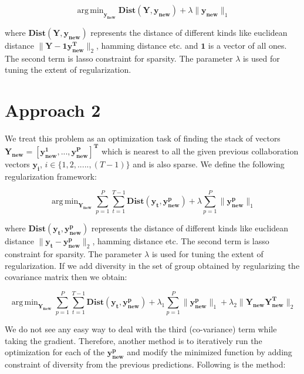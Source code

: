 \documentclass{sig-alternate}
\DeclareMathOperator*{\argmin}{arg\,min}
\begin{document}
\begin{equation}
\argmin_{\mathbf{y_{new}}}   \mathbf{Dist(Y,y_{new})} + \lambda \| \mathbf{y_{new}} \|_{1}
\end{equation}

where $\mathbf{Dist(Y,y_{new})}$ represents the distance of different kinds like euclidean distance $\| \mathbf{Y}-\mathbf{1y_{new}^T} \|_2$, hamming distance etc. and $\mathbf{1}$ is a vector of all ones. The second term is lasso constraint for sparsity. The parameter $\lambda$ is used for tuning the extent of regularization.

\section{Approach 2}

We treat this problem as an optimization task of finding the stack of vectors $\mathbf{Y_{new} = [y_{new}^{1},...,y_{new}^{P}]^{T}}$ which is nearest to all the given previous collaboration vectors $\mathbf{y_i}$, $i \in \{1,2,.....,(T-1)\}$ and is also sparse. We define the following regularization framework:

\begin{equation}
\argmin_{\mathbf{Y_{new}}}   \sum_{p=1}^{P}  \sum_{t=1}^{T-1} \mathbf{Dist(y_t,y_{new}^{p})} + \lambda \sum_{p=1}^{P} \| \mathbf{y_{new}^{p}} \|_{1}
\end{equation}

where $\mathbf{Dist(y_t,y_{new}^{p})}$ represents the distance of different kinds like euclidean distance $\| \mathbf{y_t}-\mathbf{y_{new}^{p}} \|_2$, hamming distance etc. The second term is lasso constraint for sparsity. The parameter $\lambda$ is used for tuning the extent of regularization. If we add diversity in the set of group obtained by regularizing the covariance matrix then we obtain:

\begin{equation}
\argmin_{\mathbf{Y_{new}}}   \sum_{p=1}^{P}  \sum_{t=1}^{T-1} \mathbf{Dist(y_t,y_{new}^{p})} + \lambda_1 \sum_{p=1}^{P} \| \mathbf{y_{new}^{p}} \|_{1} + \lambda_2 \| \mathbf{Y_{new}Y_{new}^{T}}\|_2
\end{equation}

We do not see any easy way to deal with the third (co-variance) term while taking the gradient. Therefore, another method is to iteratively run the optimization for each of the $\mathbf{y_{new}^{p}}$ and modify the minimized function by adding constraint of diversity from the previous predictions. Following is the method:
\end{document}
